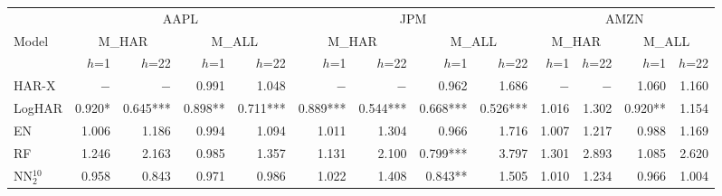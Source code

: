 \begin{tabular}{l rr rr rr rr rr rr}
\toprule
 & \multicolumn{4}{c}{AAPL} & \multicolumn{4}{c}{JPM} & \multicolumn{4}{c}{AMZN} \\
\cmidrule(lr){2-5}\cmidrule(lr){6-9}\cmidrule(lr){10-13}
Model & \multicolumn{2}{c}{M\_HAR} & \multicolumn{2}{c}{M\_ALL} & \multicolumn{2}{c}{M\_HAR} & \multicolumn{2}{c}{M\_ALL} & \multicolumn{2}{c}{M\_HAR} & \multicolumn{2}{c}{M\_ALL} \\
 & $h$=1 & $h$=22 & $h$=1 & $h$=22 & $h$=1 & $h$=22 & $h$=1 & $h$=22 & $h$=1 & $h$=22 & $h$=1 & $h$=22 \\
\midrule
HAR-X & $-$ & $-$ & 0.991 & 1.048 & $-$ & $-$ & 0.962 & 1.686 & $-$ & $-$ & 1.060 & 1.160 \\
LogHAR & 0.920* & 0.645*** & 0.898** & 0.711*** & 0.889*** & 0.544*** & 0.668*** & 0.526*** & 1.016 & 1.302 & 0.920** & 1.154 \\
EN & 1.006 & 1.186 & 0.994 & 1.094 & 1.011 & 1.304 & 0.966 & 1.716 & 1.007 & 1.217 & 0.988 & 1.169 \\
RF & 1.246 & 2.163 & 0.985 & 1.357 & 1.131 & 2.100 & 0.799*** & 3.797 & 1.301 & 2.893 & 1.085 & 2.620 \\
NN$_2^{10}$ & 0.958 & 0.843 & 0.971 & 0.986 & 1.022 & 1.408 & 0.843** & 1.505 & 1.010 & 1.234 & 0.966 & 1.004 \\
\bottomrule
\end{tabular}
